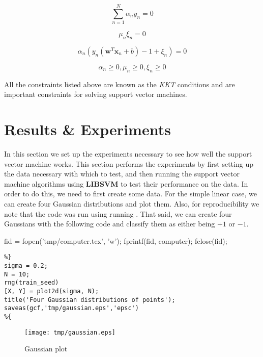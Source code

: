 \documentclass[11pt, twoside]{article}   	%
\newenvironment{matlab}{\comment}{\endcomment}
\begin{document}
\begin{equation}
\sum\limits_{n=1}^{N} \alpha_n y_n = 0
\label{eq:c3}
\end{equation}

\begin{equation}
\mu_n \xi_n = 0
\label{eq:c4}
\end{equation}

\begin{equation}
\alpha_n(y_n(\mathbf{w}^T\mathbf{x}_n + b) - 1 + \xi_n) = 0
\label{eq:c5}
\end{equation}

\begin{equation}
\alpha_n \geq 0, \mu_n \geq 0, \xi_n \geq 0
\label{eq:c6}
\end{equation}

All the constraints listed above are known as the \textit{KKT} conditions and are important
constraints for solving support vector machines. 

\section{Results \& Experiments}
 In this section we set up the experiments necessary to see how well
 the support vector machine works. This section performs the experiments
 by first setting up the data necessary with which to test, and then 
 running the support vector machine algorithms using \textbf{LIBSVM}
  to test their performance on the data. In order to do this, 
we need to first create some data. For the simple linear case, we can create
four Gaussian distributions and plot them. Also, for reproducibility 
we note that the code was run using  running
  . That said, we can create four Gaussians
with the following code and classify them as either being $+1$ or $-1$. 

\begin{matlab}

fid = fopen('tmp/computer.tex', 'w'); 
fprintf(fid, computer); 
fclose(fid); 
\end{matlab}

\begin{lstlisting}
%}
sigma = 0.2; 
N = 10; 
rng(train_seed)
[X, Y] = plot2d(sigma, N);
title('Four Gaussian distributions of points'); 
saveas(gcf,'tmp/gaussian.eps','epsc')
%{
\end{lstlisting}  


\begin{figure}[h]
\centering
\texttt{[image: tmp/gaussian.eps]}
\caption{Gaussian plot}
\label{fig:gaus} 
\end{figure}
\end{document}
